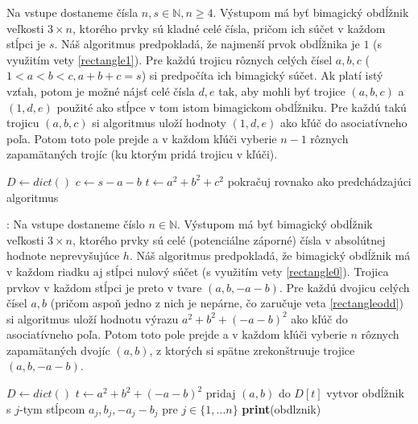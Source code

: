 \begin{subalg} Na vstupe dostaneme čísla $n,s \in \mathbb{N}, n \geq 4$. Výstupom má byť bimagický obdĺžnik veľkosti $3 \times n$, ktorého prvky sú kladné celé čísla, pričom ich súčet v každom stĺpci je $s$. Náš algoritmus predpokladá, že najmenší prvok obdĺžnika je $1$ (s využitím vety \ref{rectangle1}). Pre každú trojicu rôznych celých čísel $a,b,c$ ($1 < a < b < c, a+b+c = s$) si predpočíta ich bimagický súčet. Ak platí istý vzťah, potom je možné nájsť celé čísla $d,e$ tak, aby mohli byť trojice $(a,b,c)$ a $(1,d,e)$ použité ako stĺpce v tom istom bimagickom obdĺžniku. Pre každú takú trojicu $(a,b,c)$ si algoritmus uloží hodnoty $(1,d,e)$ ako kľúč do asociatívneho poľa. Potom toto pole prejde a v každom kľúči vyberie $n-1$ rôznych zapamätaných trojíc (ku ktorým pridá trojicu v kľúči).
\end{subalg}

\begin{algorithmic}
\STATE $D \gets dict()$
		\STATE $c \gets s-a-b$
		\STATE $t \gets a^2+b^2+c^2$
		\STATE pokračuj rovnako ako predchádzajúci algoritmus
	\ENDFOR
\ENDFOR
\end{algorithmic}

\begin{subalg}: Na vstupe dostaneme číslo $n \in \mathbb{N}$. Výstupom má byť bimagický obdĺžnik veľkosti $3 \times n$, ktorého prvky sú celé (potenciálne záporné) čísla v absolútnej hodnote neprevyšujúce $h$. Náš algoritmus predpokladá, že bimagický obdĺžnik má v každom riadku aj stĺpci nulový súčet (s využitím vety \ref{rectangle0}). Trojica prvkov v každom stĺpci je preto v tvare $(a, b, -a-b)$. Pre každú dvojicu celých čísel $a,b$ (pričom aspoň jedno z nich je nepárne, čo zaručuje veta \ref{rectangleodd}) si algoritmus uloží hodnotu výrazu $a^2 + b^2 + (-a-b)^2$ ako kľúč do asociatívneho poľa. Potom toto pole prejde a v každom kľúči vyberie $n$ rôznych zapamätaných dvojíc $(a,b)$, z ktorých si spätne zrekonštruuje trojice $(a,b,-a-b)$.
\end{subalg}

\begin{algorithmic}
\STATE $D \gets dict()$
		\STATE $t \gets a^2 + b^2 + (-a-b)^2$
		\STATE pridaj $(a,b)$ do $D[t]$
	\ENDFOR
\ENDFOR
{}
				\STATE vytvor obdĺžnik s $j$-tym stĺpcom $a_j, b_j, - a_j - b_j$ pre $j \in \{1, ... n\}$
					\STATE \textbf{print}(obdlznik)
				\ENDIF
			\ENDFOR
		\ENDIF
	\ENDFOR
\ENDFOR
\end{algorithmic}


